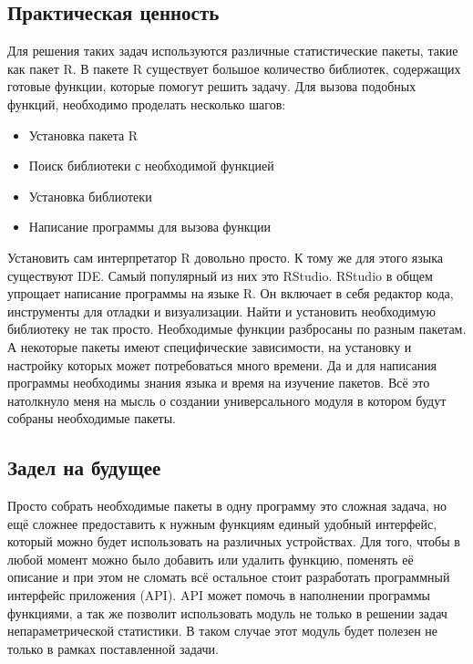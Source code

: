 \documentclass[14pt,a4paper]{scrartcl}
\begin{document}
    \subsection{Практическая ценность}
    Для решения таких задач используются различные статистические пакеты, такие как пакет R.
    В пакете R существует большое количество библиотек, содержащих готовые функции, которые помогут решить задачу.
    Для вызова подобных функций, необходимо проделать несколько шагов:

    \begin{itemize}[noitemsep]
        \item Установка пакета R
        \item Поиск библиотеки с необходимой функцией
        \item Установка библиотеки
        \item Написание программы для вызова функции
    \end{itemize}
    Установить сам интерпретатор R довольно просто.
    К тому же для этого языка существуют IDE.
    Самый популярный из них это RStudio.
    RStudio в общем упрощает написание программы на языке R.
    Он включает в себя редактор кода, инструменты для отладки и визуализации.
    Найти и установить необходимую библиотеку не так просто.
    Необходимые функции разбросаны по разным пакетам.
    А некоторые пакеты имеют специфические зависимости, на установку и настройку которых может потребоваться много времени.
    Да и для написания программы необходимы знания языка и время на изучение пакетов.
    Всё это натолкнуло меня на мысль о создании универсального модуля в котором будут собраны необходимые пакеты.

    \subsection[Задел на будущее]{Задел на будущее}
    Просто собрать необходимые пакеты в одну программу это сложная задача, но ещё сложнее предоставить к нужным функциям единый удобный интерфейс, который можно будет использовать на различных устройствах.
    Для того, чтобы в любой момент можно было добавить или удалить функцию, поменять её описание и при этом не сломать всё остальное стоит разработать программный интерфейс приложения (API).
    API может помочь в наполнении программы функциями, а так же позволит использовать модуль не только в решении задач непараметрической статистики.
    В таком случае этот модуль будет полезен не только в рамках поставленной задачи.
\end{document}
